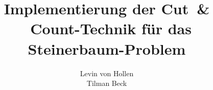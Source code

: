 \documentclass[graybox,envcountchap,openany]{svmono}
\begin{document}
\author{
Levin von Hollen\\
Tilman Beck\\
}
\title{Implementierung der Cut~\& ~Count-Technik für das
Steinerbaum-Problem}
\maketitle

\setcounter{tocdepth}{1}
\tableofcontents

%

\setlength{\parindent}{0pt} 








\begingroup
\listoffigures
\let\clearpage\relax
\listoftables
\lstlistoflistings
\endgroup



\end{document}
